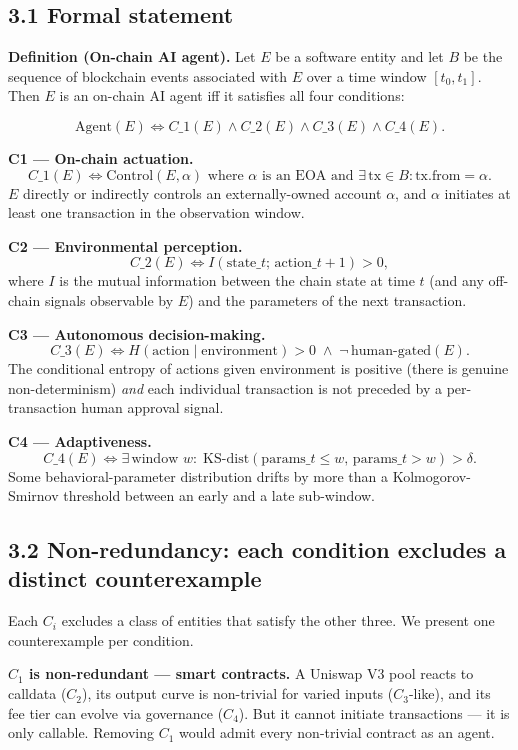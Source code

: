 \documentclass[sigconf,nonacm=false]{acmart}
\begin{document}
\subsection{3.1 Formal statement}

\textbf{Definition (On-chain AI agent).} Let $E$ be a software entity and let $B$ be the sequence of blockchain events associated with $E$ over a time window $[t_0, t_1]$. Then $E$ is an on-chain AI agent iff it satisfies all four conditions:

$$
\mathrm{Agent}(E) \iff C\_1(E) \land C\_2(E) \land C\_3(E) \land C\_4(E).
$$

\textbf{C1 --- On-chain actuation.}
$$
C\_1(E) \iff \mathrm{Control}(E, \alpha) \text{ where } \alpha \text{ is an EOA and } \exists\,\mathrm{tx} \in B : \mathrm{tx.from} = \alpha.
$$
$E$ directly or indirectly controls an externally-owned account $\alpha$, and $\alpha$ initiates at least one transaction in the observation window.

\textbf{C2 --- Environmental perception.}
$$
C\_2(E) \iff I(\mathrm{state}\_t ;\, \mathrm{action}\_{t+1}) > 0,
$$
where $I$ is the mutual information between the chain state at time $t$ (and any off-chain signals observable by $E$) and the parameters of the next transaction.

\textbf{C3 --- Autonomous decision-making.}
$$
C\_3(E) \iff H(\mathrm{action} \mid \mathrm{environment}) > 0 \;\land\; \lnot\,\mathrm{human\text{-}gated}(E).
$$
The conditional entropy of actions given environment is positive (there is genuine non-determinism) \textit{and} each individual transaction is not preceded by a per-transaction human approval signal.

\textbf{C4 --- Adaptiveness.}
$$
C\_4(E) \iff \exists\,\text{window } w :\; \mathrm{KS\text{-}dist}\!\left(\mathrm{params}\_{t \leq w},\, \mathrm{params}\_{t > w}\right) > \delta.
$$
Some behavioral-parameter distribution drifts by more than a Kolmogorov-Smirnov threshold between an early and a late sub-window.

\subsection{3.2 Non-redundancy: each condition excludes a distinct counterexample}

Each $C_i$ excludes a class of entities that satisfy the other three. We present one counterexample per condition.

\textbf{$C_1$ is non-redundant --- smart contracts.} A Uniswap V3 pool reacts to calldata ($C_2$), its output curve is non-trivial for varied inputs ($C_3$-like), and its fee tier can evolve via governance ($C_4$). But it cannot initiate transactions --- it is only callable. Removing $C_1$ would admit every non-trivial contract as an agent.
\end{document}
